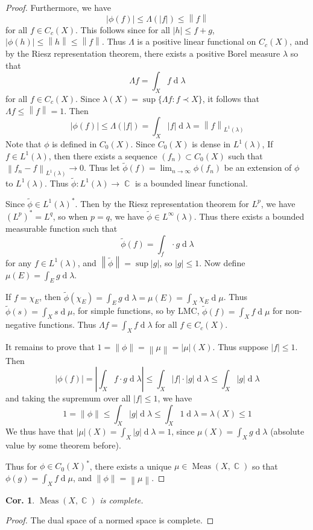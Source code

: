 \documentclass[12pt, a4paper]{book}
\DeclareMathOperator{\C}{\mathbb{C}}
\DeclareMathOperator{\Meas}{Meas}
\renewcommand{\d}[1]{\ensuremath{\operatorname{d}\!{#1}}} %
\newcommand{\norm}[1]{\left\lVert#1\right\rVert} %
\newtheorem{corollary}[theorem]{Cor.}
\theoremstyle{nonumberplain}
\newtheorem{proof}{Proof}
\begin{document}
\begin{proof}
    Furthermore, we have
    \[|\phi(f)|\leq\Lambda(|f|)\leq\norm{f}\]
    for all $f\in C_c(X)$.
    This follows since for all $|h|\leq f+g$, $|\phi(h)|\leq\norm{h}\leq\norm{f}$.
    Thus $\Lambda$ is a positive linear functional on $C_c(X)$, and by the Riesz representation theorem, there exists a positive Borel measure $\lambda$ so that
    \[\Lambda f=\int_X f\d{\lambda}\]
    for all $f\in C_c(X)$.
    Since $\lambda(X)=\sup\{\Lambda f:f\prec X\}$, it follows that$\Lambda f\leq\norm{f}=1$.
    Then
    \[|\phi(f)|\leq\Lambda(|f|)=\int_X|f|\d{\lambda}=\norm{f}_{L^1(\lambda)}\]
    Note that $\phi$ is defined in $C_0(X)$.
    Since $C_0(X)$ is dense in $L^1(\lambda)$,
    If $f\in L^1(\lambda)$, then there exists a sequence $(f_n)\subset C_0(X)$ such that $\norm{f_n-f}_{L^1(\lambda)}\to 0$.
    Thus let $\widetilde{\phi}(f)=\lim_{n\to\infty}\phi(f_n)$ be an extension of $\phi$ to $L^1(\lambda)$.
    Thus $\widetilde{\phi}:L^1(\lambda)\to\C$ is a bounded linear functional.
    
    Since $\widetilde{\phi}\in L^1(\lambda)^*$.
    Then by the Riesz representation theorem for $L^p$, we have $(L^p)^*=L^q$, so when $p=q$, we have $\tilde\phi \in L^\infty(\lambda)$.
    Thus there exists a bounded measurable function such that
    \[\widetilde{\phi}(f)=\int_f\cdot g\d{\lambda}\]
    for any $f\in L^1(\lambda)$, and $\norm{\widetilde{\phi}}=\sup|g|$, so $|g|\leq 1$.
    Now define $\mu(E)=\int_Eg\d{\lambda}$.

    If $f=\chi_E$, then $\widetilde{\phi}(\chi_E)=\int_Eg\d{\lambda}=\mu(E)=\int_X\chi_E\d{\mu}$.
    Thus $\widetilde{\phi}(s)=\int_X s\d{\mu}$, for simple functions, so by LMC, $\widetilde{\phi}(f)=\int_X f\d{\mu}$ for non-negative functions.
    Thus $\Lambda f=\int_X f\d{\lambda}$ for all $f\in C_c(X)$.

    It remains to prove that $1=\norm{\phi}=\norm{\mu}=|\mu|(X)$.
    Thus suppose $|f|\leq 1$.
    Then
    \[|\phi(f)|=\left\lvert\int_X f\cdot g\d{\lambda}\right\rvert\leq \int_X|f|\cdot|g|\d{\lambda}\leq\int_X|g|\d{\lambda}\]
    and taking the supremum over all $|f|\leq 1$, we have
    \[1=\norm{\phi}\leq\int_X|g|\d{\lambda}\leq\int_X 1\d{\lambda}=\lambda(X)\leq 1\]
    We thus have that $|\mu|(X)=\int_X|g|\d{\lambda}=1$, since $\mu(X)=\int_Xg\d{\lambda}$ (absolute value by some theorem before).

    Thus for $\phi\in C_0(X)^*$, there exists a unique $\mu\in\Meas(X,\C)$ so that $\phi(g)=\int_X f\d{\mu}$, and $\norm{\phi}=\norm{\mu}$.
\end{proof}
\begin{corollary}
    $\Meas(X,\C)$ is complete.
\end{corollary}
\begin{proof}
    The dual space of a normed space is complete.
\end{proof}
\end{document}
